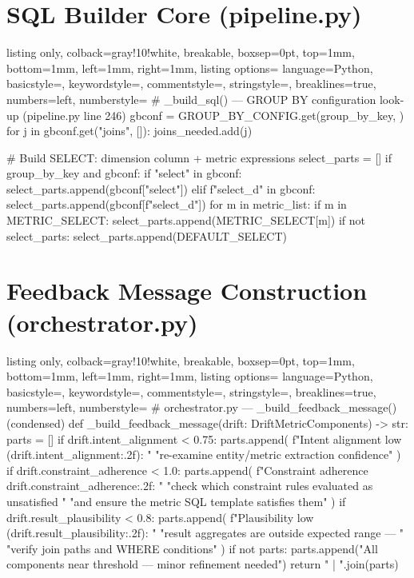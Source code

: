 \documentclass[12pt,a4paper]{report}
\begin{document}
\section{SQL Builder Core (pipeline.py)}

\begin{tcblisting}{listing only, colback=gray!10!white, breakable, boxsep=0pt,
  top=1mm, bottom=1mm, left=1mm, right=1mm,
  listing options={
    language=Python, basicstyle=\small\ttfamily,
    keywordstyle=\color{kwcolor}, commentstyle=\color{cmtcolor},
    stringstyle=\color{strcolor}, breaklines=true,
    numbers=left, numberstyle=\tiny\color{gray}}}
# _build_sql() — GROUP BY configuration look-up (pipeline.py line 246)
gbconf = GROUP_BY_CONFIG.get(group_by_key, {})
for j in gbconf.get("joins", []):
    joins_needed.add(j)

# Build SELECT: dimension column + metric expressions
select_parts = []
if group_by_key and gbconf:
    if "select" in gbconf:
        select_parts.append(gbconf["select"])
    elif f"select_{d}" in gbconf:
        select_parts.append(gbconf[f"select_{d}"])
for m in metric_list:
    if m in METRIC_SELECT:
        select_parts.append(METRIC_SELECT[m])
if not select_parts:
    select_parts.append(DEFAULT_SELECT)
\end{tcblisting}

\section{Feedback Message Construction (orchestrator.py)}

\begin{tcblisting}{listing only, colback=gray!10!white, breakable, boxsep=0pt,
  top=1mm, bottom=1mm, left=1mm, right=1mm,
  listing options={
    language=Python, basicstyle=\small\ttfamily,
    keywordstyle=\color{kwcolor}, commentstyle=\color{cmtcolor},
    stringstyle=\color{strcolor}, breaklines=true,
    numbers=left, numberstyle=\tiny\color{gray}}}
# orchestrator.py — _build_feedback_message() (condensed)
def _build_feedback_message(drift: DriftMetricComponents) -> str:
    parts = []
    if drift.intent_alignment < 0.75:
        parts.append(
            f"Intent alignment low ({drift.intent_alignment:.2f}): "
            "re-examine entity/metric extraction confidence"
        )
    if drift.constraint_adherence < 1.0:
        parts.append(
            f"Constraint adherence {drift.constraint_adherence:.2f}: "
            "check which constraint rules evaluated as unsatisfied "
            "and ensure the metric SQL template satisfies them"
        )
    if drift.result_plausibility < 0.8:
        parts.append(
            f"Plausibility low ({drift.result_plausibility:.2f}): "
            "result aggregates are outside expected range — "
            "verify join paths and WHERE conditions"
        )
    if not parts:
        parts.append("All components near threshold — minor refinement needed")
    return " | ".join(parts)
\end{tcblisting}
\end{document}
